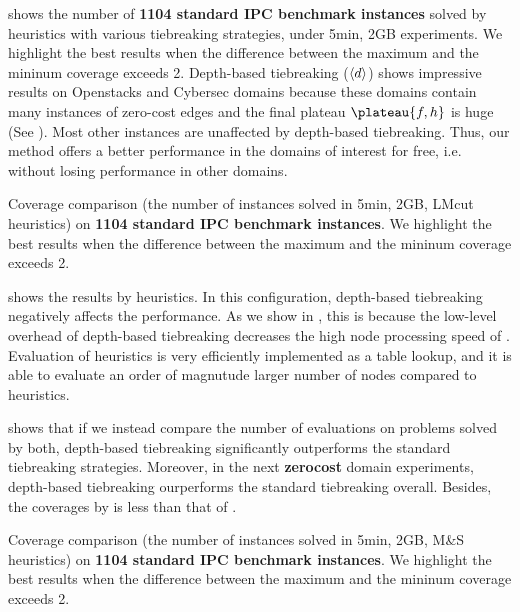  shows the number of \textbf{1104 standard
IPC benchmark instances} solved by \lmcut heuristics with various
tiebreaking strategies, under 5min, 2GB experiments. We highlight the
best results when the difference between the maximum and the mininum
coverage exceeds 2.  Depth-based tiebreaking (${\left<d\right>}$) shows
impressive results on Openstacks and Cybersec domains because these
domains contain many instances of zero-cost edges and the final plateau
$\plateau{f,h}$ is huge (See ).  Most other instances
are unaffected by depth-based tiebreaking.  Thus, our method offers a
better performance in the domains of interest for free, i.e. without
losing performance in other domains.

\begin{table}[htbp]
 {
 \centering
 
 \caption{
 Coverage comparison (the number of instances solved in 5min, 2GB, LMcut
 heuristics) on \textbf{1104 standard IPC benchmark instances}. We highlight the
 best results when the difference between the maximum and the mininum coverage exceeds 2.
 }
 \label{tbl:lmcut-ipc-full}
 }
\end{table}


 shows the results by \mands heuristics.
In this configuration, depth-based tiebreaking negatively affects the performance.
As we show in , this is because
the low-level overhead of depth-based tiebreaking decreases the high
node processing speed of \mands. Evaluation of \mands heuristics is
very efficiently implemented as a table lookup, and it is able to
evaluate an order of magnutude larger number of nodes
compared to \lmcut heuristics.

 shows that if we instead compare the
number of evaluations on problems solved by both, depth-based
tiebreaking significantly outperforms the standard tiebreaking
strategies. Moreover, in the next \textbf{zerocost} domain experiments,
depth-based tiebreaking ourperforms the standard tiebreaking
overall. Besides, the coverages by \mands is less than that of \lmcut.

\begin{table}[htbp]
 {
 \centering
 
 \caption{
 Coverage comparison (the number of instances solved in 5min, 2GB, M\&S
 heuristics) on \textbf{1104 standard IPC benchmark instances}. We highlight the
 best results when the difference between the maximum and the mininum coverage exceeds 2.
 }
 \label{tbl:mands-ipc-full}
 }
\end{table}

